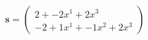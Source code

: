\documentclass[preview]{standalone}
\begin{document}
\begin{align*}
\mathbf{s} = \begin{pmatrix}2 + -2x^{1} + 2x^{3} \\ -2 + 1x^{1} + -1x^{2} + 2x^{3}\end{pmatrix}
\end{align*}
\end{document}
